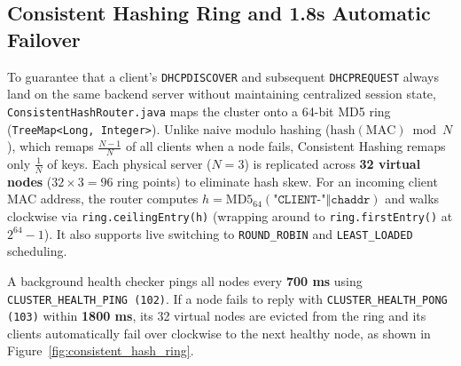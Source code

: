 \documentclass[11pt,a4paper]{article}
\begin{document}
\subsection{Consistent Hashing Ring and 1.8s Automatic Failover}
To guarantee that a client's \texttt{DHCPDISCOVER} and subsequent \texttt{DHCPREQUEST} always land on the same backend server without maintaining centralized session state, \texttt{ConsistentHashRouter.java} maps the cluster onto a 64-bit MD5 ring (\texttt{TreeMap<Long, Integer>}). Unlike naive modulo hashing ($\text{hash}(\text{MAC}) \bmod N$), which remaps $\frac{N-1}{N}$ of all clients when a node fails, Consistent Hashing remaps only $\frac{1}{N}$ of keys. Each physical server ($N=3$) is replicated across \textbf{32 virtual nodes} ($32 \times 3 = 96$ ring points) to eliminate hash skew. For an incoming client MAC address, the router computes $h = \text{MD5}_{64}(\texttt{"CLIENT-"} \mathbin{\Vert} \texttt{chaddr})$ and walks clockwise via \texttt{ring.ceilingEntry(h)} (wrapping around to \texttt{ring.firstEntry()} at $2^{64}-1$). It also supports live switching to \texttt{ROUND\_ROBIN} and \texttt{LEAST\_LOADED} scheduling.

A background health checker pings all nodes every \textbf{700 ms} using \texttt{CLUSTER\_HEALTH\_PING (102)}. If a node fails to reply with \texttt{CLUSTER\_HEALTH\_PONG (103)} within \textbf{1800 ms}, its 32 virtual nodes are evicted from the ring and its clients automatically fail over clockwise to the next healthy node, as shown in Figure~\ref{fig:consistent_hash_ring}.
\end{document}
